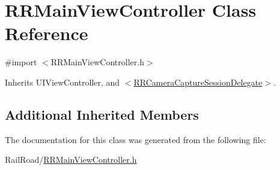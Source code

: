 \hypertarget{interface_r_r_main_view_controller}{\section{R\-R\-Main\-View\-Controller Class Reference}
\label{interface_r_r_main_view_controller}
}


{\ttfamily \#import $<$R\-R\-Main\-View\-Controller.\-h$>$}



Inherits U\-I\-View\-Controller, and \hyperlink{protocol_r_r_camera_capture_session_delegate-p}{$<$\-R\-R\-Camera\-Capture\-Session\-Delegate$>$}.

\subsection*{Additional Inherited Members}


The documentation for this class was generated from the following file\-:\begin{DoxyCompactItemize}
\item 
Rail\-Road/\hyperlink{_r_r_main_view_controller_8h}{R\-R\-Main\-View\-Controller.\-h}\end{DoxyCompactItemize}
